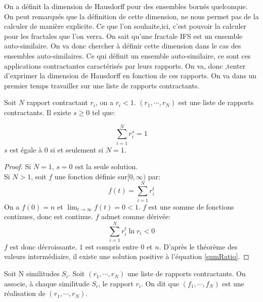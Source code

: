 \documentclass[a4paper, 12pt]{report}
\begin{document}
			On a définit la dimension de Hausdorff pour des ensembles bornés quelconque. On peut remarqués que la définition de cette dimension, ne nous permet pas de la calculer de manière explicite. Ce que l'on souhaite,ici, c'est pouvoir la calculer pour les fractales que l'on verra. On sait qu'une fractale IFS est un ensemble auto-similaire. On va donc chercher à définir cette dimension dans le cas des ensembles auto-similaires.
			Ce qui définit un ensemble auto-similaire, ce sont ces applications contractantes caractérisés par leurs rapports. On va, donc ,tenter d'exprimer la dimension de Hausdorff en fonction de ces rapports.
			\newline \hspace{0.7 cm} On va dans un premier temps travailler sur une liste de rapports contractants.
			\begin{theorem}
				Soit $N$ rapport contractant $r_i$, on a $r_i<1$. $(r_1,\cdots,r_N)$ est une liste de rapports contractants. Il existe $s\geq0$ tel que:
				
				\begin{equation}
					\sum_{i=1}^N r_i^s =1
				\end{equation}
				$s$ est égale à $0$ si et seulement si $N=1$.
			\end{theorem}
			\begin{proof}
				Si $N=1$, $s=0$ est la seule solution.\\
				Si $N>1$, soit $f$ une fonction définie sur$[0,\infty)$ par:
				\begin{equation}
				\label{sumRatio}
					f(t)=\sum_{i=1}^N r_i^t
				\end{equation}
				On a $f(0)=n$ et $\lim_{t\rightarrow\infty}f(t)=0<1$. $f$ est une somme de fonctions continues, donc est continue. $f$ admet comme dérivée:
				\begin{equation*}
					\sum_{i=1}^N r_i^t\ln r_i<0
				\end{equation*}
				$f$ est donc décroissante. $1$ est compris entre $0$ et $n$.
				D'après le théorème des valeurs intermédiaire, il existe une solution positive à l'équation \ref{sumRatio}.
			\end{proof}
			
			\begin{definition}
				Soit N similitudes $S_i$. Soit $(r_1,\cdots,r_N)$ une liste de rapports contractants. On associe, à chaque similitude $S_i$, le rapport $r_i$. On dit que $(f_1,\cdots,f_N)$ est une réalisation de $(r_1,\cdots,r_N)$.
			\end{definition}
\end{document}
